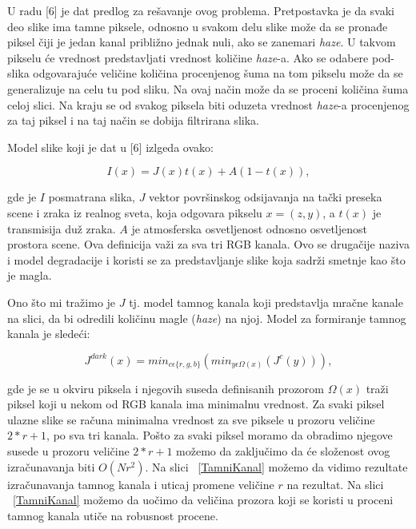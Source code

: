 \documentclass[a4paper,12pt,titlepage]{article}
\begin{document}
U radu [6] je dat predlog za rešavanje ovog problema. Pretpostavka je da svaki deo slike ima tamne piksele, odnosno u svakom delu slike može da se pronađe piksel čiji je jedan kanal približno jednak nuli, ako se zanemari \emph{haze}. U takvom pikselu će vrednost predstavljati vrednost količine \emph{haze}-a. Ako se odabere pod-slika odgovarajuće veličine količina procenjenog šuma na tom pikselu može da se generalizuje na celu tu pod sliku. Na ovaj način može da se proceni količina šuma celoj slici. Na kraju se od svakog piksela biti oduzeta vrednost \emph{haze}-a procenjenog za taj piksel i na taj način se dobija filtrirana slika.

Model slike koji je dat u [6] izlgeda ovako:

\begin{equation}\label{eq:haze1}
I(x) = J(x)t(x) + A(1 - t(x)),
\end{equation}

gde je $I$ posmatrana slika, $J$ vektor površinskog odsijavanja na tački preseka scene i zraka iz realnog sveta, koja odgovara pikselu $x = (z, y)$, a $t(x)$ je transmisija duž zraka. $A$ je atmosferska osvetljenost odnosno osvetljenost prostora scene. Ova definicija važi za sva tri RGB kanala. Ovo se drugačije naziva i model degradacije i koristi se za predstavljanje slike koja sadrži smetnje kao što je magla. 

Ono što mi tražimo je $J$ tj. model tamnog kanala koji predstavlja mračne kanale na slici, da bi odredili količinu magle (\emph{haze}) na njoj. Model za formiranje tamnog kanala je sledeći:

\begin{equation}\label{eq:haze2}
J^{dark}(x) = min_{c \epsilon \{r, g, b \}}( min_{y \epsilon \Omega (x)} (J^c (y)) ),
\end{equation}

gde je se u okviru piksela i njegovih suseda definisanih prozorom $\Omega(x)$ traži piksel koji u nekom od RGB kanala ima minimalnu vrednost. Za svaki piksel ulazne slike se računa minimalna vrednost za sve piksele u prozoru veličine $2*r + 1$, po sva tri kanala. Pošto za svaki piksel moramo da obradimo njegove susede u prozoru veličine $2*r + 1$ možemo da zaključimo da će složenost ovog izračunavanja biti $O(Nr^2)$. Na slici ~\ref{TamniKanal} možemo da vidimo rezultate izračunavanja tamnog kanala i uticaj promene veličine $r$ na rezultat. Na slici ~\ref{TamniKanal} možemo da uočimo da veličina prozora koji se koristi u proceni tamnog kanala utiče na robusnost procene. 
\end{document}
